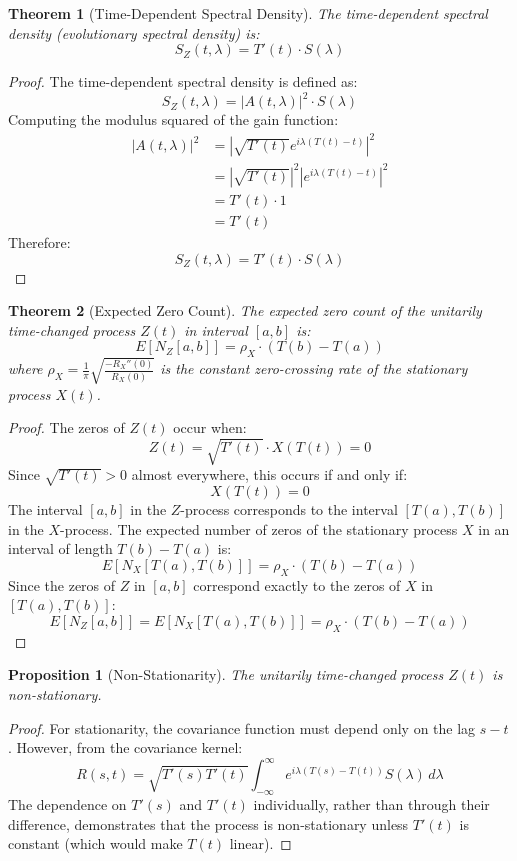 \documentclass{article}
\newtheorem{theorem}{Theorem}
\newtheorem{proposition}{Proposition}
\begin{document}
\begin{theorem}[Time-Dependent Spectral Density]
The time-dependent spectral density (evolutionary spectral density) is:
\[
S_Z(t,\lambda) = T'(t) \cdot S(\lambda)
\]
\end{theorem}

\begin{proof}
The time-dependent spectral density is defined as:
\[
S_Z(t,\lambda) = |A(t,\lambda)|^2 \cdot S(\lambda)
\]
Computing the modulus squared of the gain function:
\begin{align}
|A(t,\lambda)|^2 &= \left|\sqrt{T'(t)} e^{i\lambda(T(t)-t)}\right|^2 \\
&= \left|\sqrt{T'(t)}\right|^2 \left|e^{i\lambda(T(t)-t)}\right|^2 \\
&= T'(t) \cdot 1 \\
&= T'(t)
\end{align}
Therefore:
\[
S_Z(t,\lambda) = T'(t) \cdot S(\lambda)
\]
\end{proof}

\begin{theorem}[Expected Zero Count]
The expected zero count of the unitarily time-changed process $Z(t)$ in interval $[a,b]$ is:
\[
E[N_Z[a,b]] = \rho_X \cdot (T(b) - T(a))
\]
where $\rho_X = \frac{1}{\pi} \sqrt{\frac{-R_X''(0)}{R_X(0)}}$ is the constant zero-crossing rate of the stationary process $X(t)$.
\end{theorem}

\begin{proof}
The zeros of $Z(t)$ occur when:
\[
Z(t) = \sqrt{T'(t)} \cdot X(T(t)) = 0
\]
Since $\sqrt{T'(t)} > 0$ almost everywhere, this occurs if and only if:
\[
X(T(t)) = 0
\]
The interval $[a,b]$ in the $Z$-process corresponds to the interval $[T(a), T(b)]$ in the $X$-process. The expected number of zeros of the stationary process $X$ in an interval of length $T(b) - T(a)$ is:
\[
E[N_X[T(a), T(b)]] = \rho_X \cdot (T(b) - T(a))
\]
Since the zeros of $Z$ in $[a,b]$ correspond exactly to the zeros of $X$ in $[T(a), T(b)]$:
\[
E[N_Z[a,b]] = E[N_X[T(a), T(b)]] = \rho_X \cdot (T(b) - T(a))
\]
\end{proof}

\begin{proposition}[Non-Stationarity]
The unitarily time-changed process $Z(t)$ is non-stationary.
\end{proposition}

\begin{proof}
For stationarity, the covariance function must depend only on the lag $s-t$. However, from the covariance kernel:
\[
R(s,t) = \sqrt{T'(s)T'(t)} \int_{-\infty}^{\infty} e^{i\lambda(T(s)-T(t))} S(\lambda) \, d\lambda
\]
The dependence on $T'(s)$ and $T'(t)$ individually, rather than through their difference, demonstrates that the process is non-stationary unless $T'(t)$ is constant (which would make $T(t)$ linear).
\end{proof}
\end{document}
